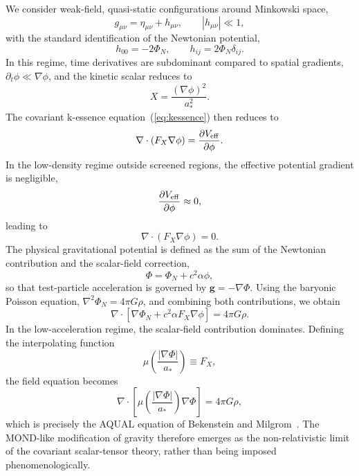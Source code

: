 \documentclass[11pt,a4paper]{article}
\begin{document}
We consider weak-field, quasi-static configurations around Minkowski space,
\begin{equation}
  g_{\mu\nu} = \eta_{\mu\nu} + h_{\mu\nu}, \qquad |h_{\mu\nu}| \ll 1,
\end{equation}
with the standard identification of the Newtonian potential,
\begin{equation}
  h_{00} = -2\Phi_N, \qquad h_{ij} = 2\Phi_N \delta_{ij}.
\end{equation}
In this regime, time derivatives are subdominant compared to spatial gradients,
$\partial_t \phi \ll \nabla \phi$, and the kinetic scalar reduces to
\begin{equation}
  X = \frac{(\nabla \phi)^2}{a_*^2}.
\end{equation}
The covariant k-essence equation~(\ref{eq:kessence}) then reduces to
\begin{equation}
  \nabla \cdot \left( F_X \nabla \phi \right) = \frac{\partial V_{\rm eff}}{\partial \phi}.
\end{equation}
In the low-density regime outside screened regions, the effective potential
gradient is negligible,
\begin{equation}
  \frac{\partial V_{\rm eff}}{\partial \phi} \approx 0,
\end{equation}
leading to
\begin{equation}
  \nabla \cdot \left( F_X \nabla \phi \right) = 0.
\end{equation}
The physical gravitational potential is defined as the sum of the Newtonian
contribution and the scalar-field correction,
\begin{equation}
  \Phi = \Phi_N + c^2 \alpha \phi,
\end{equation}
so that test-particle acceleration is governed by $\mathbf{g} = -\nabla \Phi$.
Using the baryonic Poisson equation,
$\nabla^2 \Phi_N = 4\pi G \rho$,
and combining both contributions, we obtain
\begin{equation}
  \nabla \cdot \left[ \nabla \Phi_N + c^2 \alpha F_X \nabla \phi \right]
  = 4\pi G \rho.
\end{equation}
In the low-acceleration regime, the scalar-field contribution dominates.
Defining the interpolating function
\begin{equation}
  \mu\!\left(\frac{|\nabla \Phi|}{a_*}\right) \equiv F_X,
\end{equation}
the field equation becomes
\begin{equation}
  \nabla \cdot \left[
    \mu\!\left(\frac{|\nabla \Phi|}{a_*}\right)\nabla \Phi
  \right]
  = 4\pi G \rho,
\end{equation}
which is precisely the AQUAL equation of Bekenstein and Milgrom~\cite{Bekenstein1984}.
The MOND-like modification of gravity therefore emerges as the non-relativistic
limit of the covariant scalar-tensor theory, rather than being imposed
phenomenologically.
\end{document}
